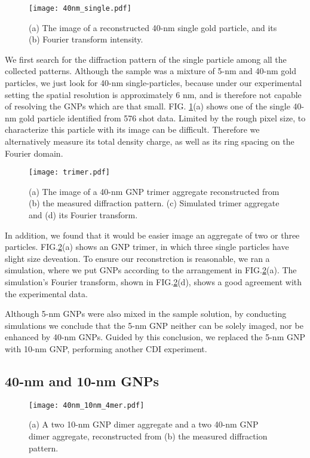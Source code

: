 \documentclass[aps,prb,reprint,groupedaddress, superscriptaddress]{revtex4-1}
\begin{document}
\begin{figure}
	\texttt{[image: 40nm\_single.pdf]}%
	\caption{(a) The image of a reconstructed 40-nm single gold particle, and its (b) Fourier transform intensity.}
	\label{fig:40nm_single}
\end{figure}

We first search for the diffraction pattern of the single particle among all the collected patterns. 
Although the sample was a mixture of 5-nm and 40-nm gold particles, we just look for 40-nm single-particles, because under our experimental setting the spatial resolution is approximately 6 nm, and is therefore not capable of resolving the GNPs which are that small.
FIG. \ref{fig:40nm_single}(a) shows one of the single 40-nm gold particle identified from 576 shot data.
Limited by the rough pixel size, to characterize this particle with its image can be difficult.
Therefore we alternatively measure its total density charge, as well as its ring spacing on the Fourier domain.

\begin{figure}
	\texttt{[image: trimer.pdf]}%
	\caption{(a) The image of a 40-nm GNP trimer aggregate reconstructed from (b) the measured diffraction pattern. (c) Simulated trimer aggregate and (d) its Fourier transform.}
	\label{fig:trimer}
\end{figure}

In addition, we found that it would be easier image an aggregate of two or three particles. 
FIG.\ref{fig:trimer}(a) shows an GNP trimer, in which three single particles have slight size deveation.
To ensure our reconstrction is reasonable, we ran a simulation, where we put GNPs according to the arrangement in FIG.\ref{fig:trimer}(a). 
The simulation's Fourier transform, shown in FIG.\ref{fig:trimer}(d), shows a good agreement with the experimental data.

Although 5-nm GNPs were also mixed in the sample solution, by conducting simulations we conclude that the 5-nm GNP neither can be solely imaged, nor be enhanced by 40-nm GNPs.
Guided by this conclusion, we replaced the 5-nm GNP with 10-nm GNP, performing another CDI experiment.


\subsection{40-nm and 10-nm GNPs}

\begin{figure}
	\texttt{[image: 40nm\_10nm\_4mer.pdf]}%
	\caption{(a) A two 10-nm GNP dimer aggregate and a two 40-nm GNP dimer aggregate, reconstructed from (b) the measured diffraction pattern.}
	\label{fig:40nm_10nm_4mer}
\end{figure}
\end{document}
